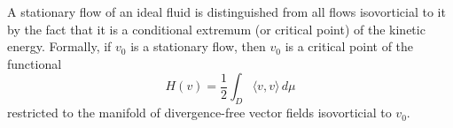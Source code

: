 A stationary flow of an ideal fluid is distinguished from all flows isovorticial to it by the fact that it is a conditional extremum (or critical point) of the kinetic energy. Formally, if $v_0$ is a stationary flow, then $v_0$ is a critical point of the functional
$$H(v) = \frac{1}{2} \int_D \langle v, v \rangle \, d\mu$$
restricted to the manifold of divergence-free vector fields isovorticial to $v_0$.
